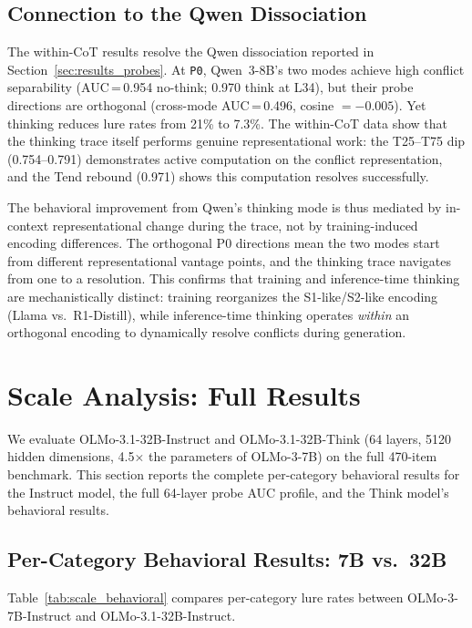 \documentclass{article}
\newcommand{\sone}{S1-like}
\newcommand{\stwo}{S2-like}
\newcommand{\pzero}{\texttt{P0}}
\begin{document}
\subsection{Connection to the Qwen Dissociation}

The within-CoT results resolve the Qwen dissociation reported in
Section~\ref{sec:results_probes}.  At \pzero{}, Qwen~3-8B's two modes
achieve high conflict separability (AUC\,=\,0.954 no-think; 0.970 think
at L34), but their probe directions are orthogonal (cross-mode
AUC\,=\,0.496, cosine $= -0.005$).  Yet thinking reduces lure rates
from 21\% to 7.3\%.  The within-CoT data show that the thinking
trace itself performs genuine representational work: the T25--T75
dip (0.754--0.791) demonstrates active computation on the conflict
representation, and the Tend rebound (0.971) shows this computation
resolves successfully.

The behavioral improvement from Qwen's thinking mode is thus
mediated by in-context representational change during the trace,
not by training-induced encoding differences.  The orthogonal P0
directions mean the two modes start from different representational
vantage points, and the thinking trace navigates from one to a
resolution.  This confirms that training and inference-time
thinking are mechanistically distinct: training reorganizes the
\sone{}/\stwo{} encoding (Llama vs.\ R1-Distill), while
inference-time thinking operates \emph{within} an orthogonal
encoding to dynamically resolve conflicts during generation.

\section{Scale Analysis: Full Results}
\label{app:scale}

We evaluate OLMo-3.1-32B-Instruct and OLMo-3.1-32B-Think (64 layers,
5120 hidden dimensions, 4.5$\times$ the parameters of OLMo-3-7B) on
the full 470-item benchmark.  This section reports the complete
per-category behavioral results for the Instruct model, the full
64-layer probe AUC profile, and the Think model's behavioral results.

\subsection{Per-Category Behavioral Results: 7B vs.\ 32B}

Table~\ref{tab:scale_behavioral} compares per-category lure rates
between OLMo-3-7B-Instruct and OLMo-3.1-32B-Instruct.
\end{document}
